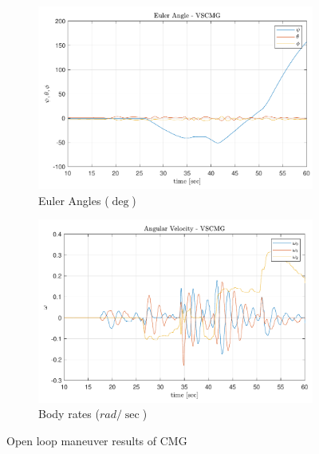 \begin{figure}
     \centering
     \begin{subfigure}[b]{0.45\textwidth}
     \centering
\includegraphics[width=1.0\textwidth]{figures/plots/exp/cm-eul1.pdf}
    \caption{Euler Angles ($\deg$)}
    \label{fig:cm-eul1}
    \end{subfigure}
     \begin{subfigure}[b]{0.45\textwidth}
     \centering
\includegraphics[width=1.0\textwidth]{figures/plots/exp/cm-w1.pdf}
    \caption{Body rates ($rad / \sec$)}
    \label{fig:cm-w1}

     \end{subfigure}
        \caption{Open loop maneuver results of CMG}
        \label{fig:ol.cmg}
\end{figure}


